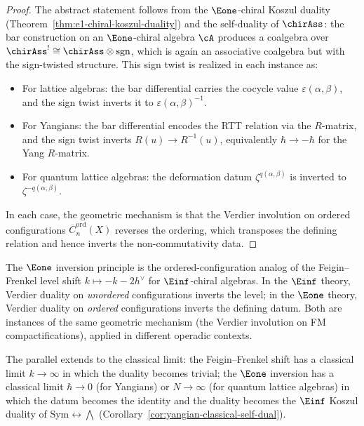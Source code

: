 \begin{proof}
The abstract statement follows from the $\Eone$-chiral Koszul duality
(Theorem~\ref{thm:e1-chiral-koszul-duality}) and the self-duality of
$\chirAss$: the bar construction on an $\Eone$-chiral algebra
$\cA$ produces a coalgebra over
${\chirAss}^! \cong \chirAss \otimes \mathrm{sgn}$, which is again an
associative coalgebra but with the sign-twisted structure. This sign
twist is realized in each instance as:
\begin{itemize}
\item For lattice algebras: the bar differential carries the cocycle
 value $\varepsilon(\alpha,\beta)$, and the sign twist inverts it to
 $\varepsilon(\alpha,\beta)^{-1}$.
\item For Yangians: the bar differential encodes the RTT relation via
 the $R$-matrix, and the sign twist inverts
 $R(u) \to R^{-1}(u)$, equivalently $\hbar \to -\hbar$ for the
 Yang $R$-matrix.
\item For quantum lattice algebras: the deformation datum
 $\zeta^{q(\alpha,\beta)}$ is inverted to
 $\zeta^{-q(\alpha,\beta)}$.
\end{itemize}
In each case, the geometric mechanism is that the Verdier involution
on ordered configurations $\overline{C}^{\mathrm{ord}}_n(X)$ reverses
the ordering, which transposes the defining relation and hence
inverts the non-commutativity data.
\end{proof}

\begin{remark}
\label{rem:e1-ff-comparison}
The $\Eone$ inversion principle is the ordered-configuration analog
of the Feigin--Frenkel level shift $k \mapsto -k - 2h^\vee$ for
$\Einf$-chiral algebras. In the $\Einf$ theory, Verdier duality on
\emph{unordered} configurations inverts the level; in the $\Eone$
theory, Verdier duality on \emph{ordered} configurations inverts the
defining datum. Both are instances of the same geometric mechanism
(the Verdier involution on FM compactifications), applied in different
operadic contexts.

The parallel extends to the classical limit: the Feigin--Frenkel
shift has a classical limit $k \to \infty$ in which the duality
becomes trivial; the $\Eone$ inversion has a classical limit
$\hbar \to 0$ (for Yangians) or $N \to \infty$ (for quantum
lattice algebras) in which the datum becomes the identity and the
duality becomes the $\Einf$ Koszul duality of
$\mathrm{Sym} \leftrightarrow \bigwedge$
(Corollary~\ref{cor:yangian-classical-self-dual}).
\end{remark}


